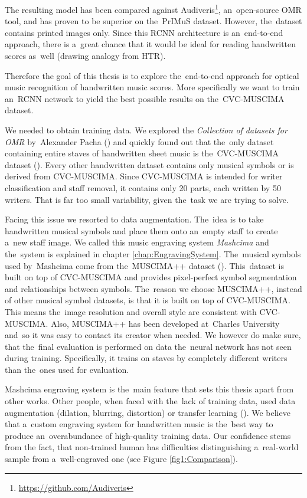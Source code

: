 The resulting model has been compared against Audiveris\footnote{\href{https://github.com/Audiveris}{https://github.com/Audiveris}}, an~open-source OMR tool, and has proven to be superior on the~PrIMuS dataset. However, the~dataset contains printed images only. Since this RCNN architecture is an~end-to-end approach, there is a~great chance that it would be ideal for reading handwritten scores as~well (drawing analogy from HTR).

Therefore the goal of this thesis is to explore the~end-to-end approach for optical music recognition of handwritten music scores. More specifically we want to train an~RCNN network to yield the best possible results on the~CVC-MUSCIMA dataset.

\overfullrule=0pt %
We needed to obtain training data. We explored the \emph{Collection of datasets for OMR} by~Alexander Pacha (\cite{Pacha}) and quickly found out that the~only dataset containing entire staves of handwritten sheet music is the~CVC-MUSCIMA dataset (\cite{CvcMuscima}). Every other handwritten dataset contains only musical symbols or is derived from CVC-MUSCIMA. Since CVC-MUSCIMA is intended for writer classification and staff removal, it contains only 20 parts, each written by 50 writers. That is far too small variability, given the~task we are trying to solve.

Facing this issue we resorted to data augmentation. The~idea is to take handwritten musical symbols and place them onto an~empty staff to create a~new staff image. We called this music engraving system \emph{Mashcima} and the~system is explained in chapter \ref{chap:EngravingSystem}. The~musical symbols used by~Mashcima come from the~MUSCIMA++ dataset (\cite{MuscimaPP}). This~dataset is built on top of CVC-MUSCIMA and provides pixel-perfect symbol segmentation and relationships between symbols. The~reason we choose MUSCIMA++, instead of other musical symbol datasets, is that it is built on top of CVC-MUSCIMA. This means the~image resolution and overall style are consistent with CVC-MUSCIMA. Also, MUSCIMA++ has been developed at~Charles University and~so it was easy to contact its creator when needed. We however do make sure, that the~final evaluation is performed on data the~neural network has not seen during training. Specifically, it trains on staves by completely different writers than the~ones used for evaluation.

Mashcima engraving system is the~main feature that sets this thesis apart from other works. Other people, when faced with the~lack of training data, used data augmentation (dilation, blurring, distortion) or transfer learning (\cite{HmrBaseline}). We believe that a~custom engraving system for handwritten music is the~best way to produce an~overabundance of high-quality training data. Our confidence stems from the fact, that non-trained human has difficulties distinguishing a~real-world sample from a~well-engraved one (see Figure \ref{fig1:Comparison}).

